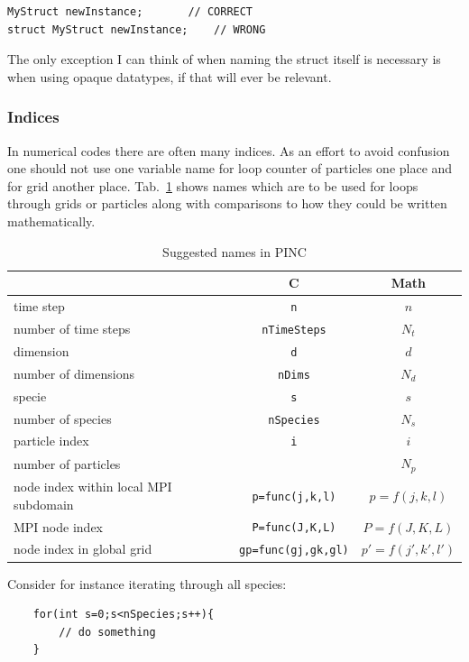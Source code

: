 \documentclass[10pt,a4paper]{article}
\newcommand{\reftab}[1]{Tab.~\ref{tab:#1}}
\begin{document}
\begin{lstlisting}
MyStruct newInstance;		// CORRECT
struct MyStruct newInstance;	// WRONG
\end{lstlisting}
The only exception I can think of when naming the struct itself is necessary is when using opaque datatypes, if that will ever be relevant.

\subsubsection{Indices}
In numerical codes there are often many indices. As an effort to avoid confusion one should not use one variable name for loop counter of particles one place and for grid another place. \reftab{suggested_names} shows names which are to be used for loops through grids or particles along with comparisons to how they could be written mathematically.

\begin{table}
	\centering
	\caption{Suggested names in PINC}
	\begin{tabular}{|l|c|c|}
		\hline
										& C 							& Math			\\
		\hline \hline
		time step						& \lstinline$n$				& $n$			\\
		number of time steps				& \lstinline$nTimeSteps$		& $N_t$			\\
		\hline
		dimension						& \lstinline$d$				& $d$			\\
		number of dimensions				& \lstinline$nDims$			& $N_d$			\\
		\hline
		specie							& \lstinline$s$				& $s$			\\
		number of species				& \lstinline$nSpecies$		& $N_s$			\\
		\hline
		particle index					& \lstinline$i$				& $i$			\\
		number of particles				& 							& $N_p$			\\
		\hline
		node index within local MPI subdomain	& \lstinline$p=func(j,k,l)$			& $p=f(j,k,l)$		\\
		MPI node index					& \lstinline$P=func(J,K,L)$			& $P=f(J,K,L)$ 		\\
		node index in global grid		& \lstinline$gp=func(gj,gk,gl)$		& $p'=f(j',k',l')$	\\
		\hline
	\end{tabular}
	\label{tab:suggested_names}
\end{table}

Consider for instance iterating through all species:
\begin{lstlisting}
	for(int s=0;s<nSpecies;s++){
		// do something
	}
\end{lstlisting}
\end{document}
